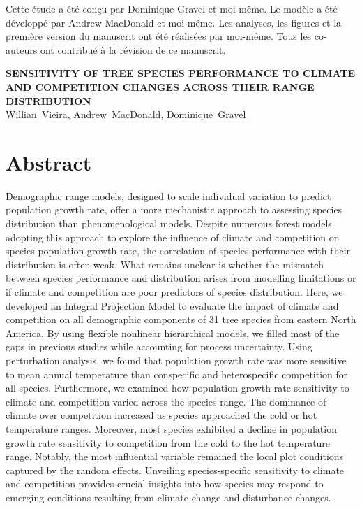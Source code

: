 Cette étude a été conçu par Dominique Gravel et moi-même. Le modèle a
été développé par Andrew MacDonald et moi-même. Les analyses, les
figures et la première version du manuscrit ont été réalisées par
moi-même. Tous les co-auteurs ont contribué à la révision de ce
manuscrit.\\

\vfill{}
\pagebreak

\begin{center}
\textbf{\MakeUppercase{Sensitivity of tree species performance to
climate and competition changes across their range distribution}} \\
Willian~Vieira, Andrew~MacDonald, Dominique~Gravel
\end{center}

\section{Abstract}

Demographic range models, designed to scale individual variation to
predict population growth rate, offer a more mechanistic approach to
assessing species distribution than phenomenological models. Despite
numerous forest models adopting this approach to explore the influence
of climate and competition on species population growth rate, the
correlation of species performance with their distribution is often
weak. What remains unclear is whether the mismatch between species
performance and distribution arises from modelling limitations or if
climate and competition are poor predictors of species distribution.
Here, we developed an Integral Projection Model to evaluate the impact
of climate and competition on all demographic components of 31 tree
species from eastern North America. By using flexible nonlinear
hierarchical models, we filled most of the gaps in previous studies
while accounting for process uncertainty. Using perturbation analysis,
we found that population growth rate was more sensitive to mean annual
temperature than conspecific and heterospecific competition for all
species. Furthermore, we examined how population growth rate sensitivity
to climate and competition varied across the species range. The
dominance of climate over competition increased as species approached
the cold or hot temperature ranges. Moreover, most species exhibited a
decline in population growth rate sensitivity to competition from the
cold to the hot temperature range. Notably, the most influential
variable remained the local plot conditions captured by the random
effects. Unveiling species-specific sensitivity to climate and
competition provides crucial insights into how species may respond to
emerging conditions resulting from climate change and disturbance
changes.\\

